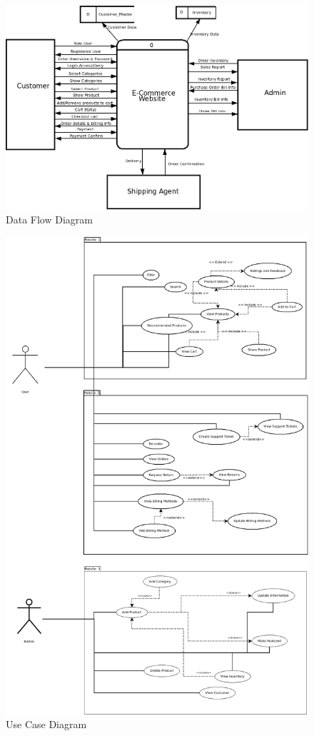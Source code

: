 \documentclass{report}
\begin{document}
\begin{figure}[h!]
\includegraphics[width=\linewidth]{Diagrams/DataFlowDiagram.png}
\caption{Data Flow Diagram}
\label{fig:DataFlow}
\end{figure}

\begin{figure}[h!]
\includegraphics[width=\linewidth]{Diagrams/UseCaseDiagram.png}
\caption{Use Case Diagram}
\label{fig:UseCase}
\end{figure}
\end{document}
